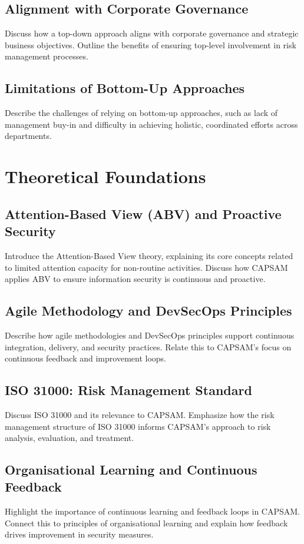     \subsection{Alignment with Corporate Governance}
    Discuss how a top-down approach aligns with corporate governance and strategic business objectives. Outline the benefits of ensuring top-level involvement in risk management processes.

    \subsection{Limitations of Bottom-Up Approaches}
    Describe the challenges of relying on bottom-up approaches, such as lack of management buy-in and difficulty in achieving holistic, coordinated efforts across departments.

\section{Theoretical Foundations}
    \subsection{Attention-Based View (ABV) and Proactive Security}
    Introduce the Attention-Based View theory, explaining its core concepts related to limited attention capacity for non-routine activities. Discuss how CAPSAM applies ABV to ensure information security is continuous and proactive.

    \subsection{Agile Methodology and DevSecOps Principles}
    Describe how agile methodologies and DevSecOps principles support continuous integration, delivery, and security practices. Relate this to CAPSAM’s focus on continuous feedback and improvement loops.

    \subsection{ISO 31000: Risk Management Standard}
    Discuss ISO 31000 and its relevance to CAPSAM. Emphasize how the risk management structure of ISO 31000 informs CAPSAM’s approach to risk analysis, evaluation, and treatment.

    \subsection{Organisational Learning and Continuous Feedback}
    Highlight the importance of continuous learning and feedback loops in CAPSAM. Connect this to principles of organisational learning and explain how feedback drives improvement in security measures.

